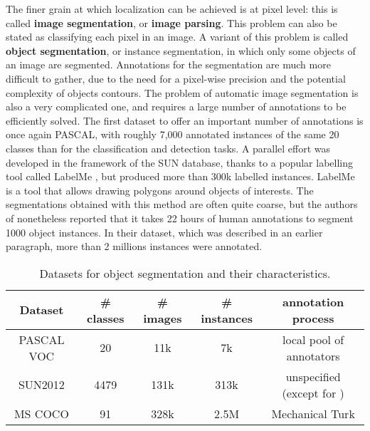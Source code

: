 The finer grain at which localization can be achieved is at pixel level: this is called \textbf{image segmentation}, or \textbf{image parsing}. This problem can also be stated as classifying each pixel in an image. A variant of this problem is called \textbf{object segmentation}, or instance segmentation, in which only some objects of an image are segmented. Annotations for the segmentation are much more difficult to gather, due to the need for a pixel-wise precision and the potential complexity of objects contours. The problem of automatic image segmentation is also a very complicated one, and requires a large number of annotations to be efficiently solved. The first dataset to offer an important number of annotations is once again PASCAL, with roughly 7,000 annotated instances of the same 20 classes than for the classification and detection tasks. A parallel effort was developed in the framework of the SUN database, thanks to a popular labelling tool called LabelMe \cite{russell2008labelme}, but produced more than 300k labelled instances. LabelMe is a tool that allows drawing polygons around objects of interests. The segmentations obtained with this method are often quite coarse, but the authors of \cite{chen2015microsoft} nonetheless reported that it takes 22 hours of human annotations to segment 1000 object instances. In their dataset, which was described in an earlier paragraph, more than 2 millions instances were annotated. 

\vspace{0.5cm}

\begin{table}
	\centering
	\caption{Datasets for object segmentation and their characteristics.}
	\begin{tabular}{|c|c|c|c|c|}
		\hline
		Dataset & \# classes & \# images & \# instances & annotation process \\
		\hline
		PASCAL VOC \cite{Everingham10} & 20 & 11k & 7k & local pool of annotators \\
		SUN2012 \cite{xiao2010sun} & 4479 & 131k & 313k & unspecified (except for \cite{barriuso2012notes}) \\
		MS COCO \cite{chen2015microsoft} & 91 & 328k & 2.5M & Mechanical Turk \\
		\hline
	\end{tabular}
	\label{tab:segmentation_ds}
\end{table}
\vspace{0.5cm}

